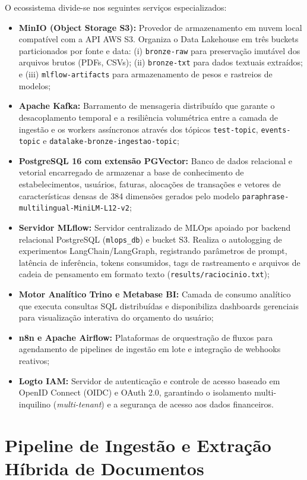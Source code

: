 \documentclass[
	12pt,				
	openright,			
	oneside,			
	a4paper,			
	english,			
	brazil				
	]{abntex2}
\begin{document}
O ecossistema divide-se nos seguintes serviços especializados:
\begin{itemize}
    \item \textbf{MinIO (Object Storage S3):} Provedor de armazenamento em nuvem local compatível com a API AWS S3. Organiza o Data Lakehouse em três buckets particionados por fonte e data: (i) \texttt{bronze-raw} para preservação imutável dos arquivos brutos (PDFs, CSVs); (ii) \texttt{bronze-txt} para dados textuais extraídos; e (iii) \texttt{mlflow-artifacts} para armazenamento de pesos e rastreios de modelos;
    \item \textbf{Apache Kafka:} Barramento de mensageria distribuído que garante o desacoplamento temporal e a resiliência volumétrica entre a camada de ingestão e os workers assíncronos através dos tópicos \texttt{test-topic}, \texttt{events-topic} e \texttt{datalake-bronze-ingestao-topic};
    \item \textbf{PostgreSQL 16 com extensão PGVector:} Banco de dados relacional e vetorial encarregado de armazenar a base de conhecimento de estabelecimentos, usuários, faturas, alocações de transações e vetores de características densas de 384 dimensões gerados pelo modelo \texttt{paraphrase-multilingual-MiniLM-L12-v2};
    \item \textbf{Servidor MLflow:} Servidor centralizado de MLOps apoiado por backend relacional PostgreSQL (\texttt{mlops\_db}) e bucket S3. Realiza o autologging de experimentos LangChain/LangGraph, registrando parâmetros de prompt, latência de inferência, tokens consumidos, tags de rastreamento e arquivos de cadeia de pensamento em formato texto (\texttt{results/raciocinio.txt});
    \item \textbf{Motor Analítico Trino e Metabase BI:} Camada de consumo analítico que executa consultas SQL distribuídas e disponibiliza dashboards gerenciais para visualização interativa do orçamento do usuário;
    \item \textbf{n8n e Apache Airflow:} Plataformas de orquestração de fluxos para agendamento de pipelines de ingestão em lote e integração de webhooks reativos;
    \item \textbf{Logto IAM:} Servidor de autenticação e controle de acesso baseado em OpenID Connect (OIDC) e OAuth 2.0, garantindo o isolamento multi-inquilino (\textit{multi-tenant}) e a segurança de acesso aos dados financeiros.
\end{itemize}

\section{Pipeline de Ingestão e Extração Híbrida de Documentos}
\label{sec:sol_extracao_hibrida}
\end{document}
